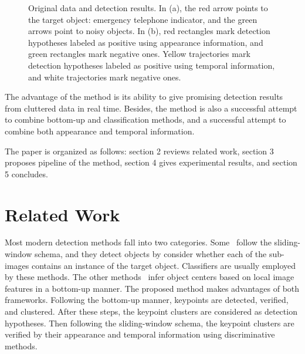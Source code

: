\begin{figure}
\centering
{}
\caption[short title]{Original data and detection results. In (a), the red arrow points to the target object: emergency telephone indicator, and the green arrows point to noisy objects. In (b), red rectangles mark detection hypotheses labeled as positive using appearance information, and green rectangles mark negative ones. Yellow trajectories mark detection hypotheses labeled as positive using temporal information, and white trajectories mark negative ones.}
\label{fig:first}
\end{figure}







The advantage of the method is its ability to give promising detection results from cluttered data in real time. Besides, the method is also a successful attempt to combine bottom-up and classification methods, and a successful attempt to combine both appearance and temporal information.

The paper is organized as follows: section 2 reviews related work, section 3 proposes pipeline of the method, section 4 gives experimental results, and section 5 concludes.

\section{Related Work}


Most modern detection methods fall into two categories. Some~\cite{ij4,ac31,ac30,ac4,ac32,ac29,ac28,ac1} follow the sliding-window schema, and they detect objects by consider whether each of the sub-images contains an instance of the target object. Classifiers are usually employed by these methods. The other methods~\cite{ac9,ac2,ac3,ac22,lb1,ac5,ac10,ac21,ac18} infer object centers based on local image features in a bottom-up manner. The proposed method makes advantages of both frameworks. Following the bottom-up manner, keypoints are detected, verified, and clustered. After these steps, the keypoint clusters are considered as detection hypotheses. Then following the sliding-window schema, the keypoint clusters are verified by their appearance and temporal information using discriminative methods.

